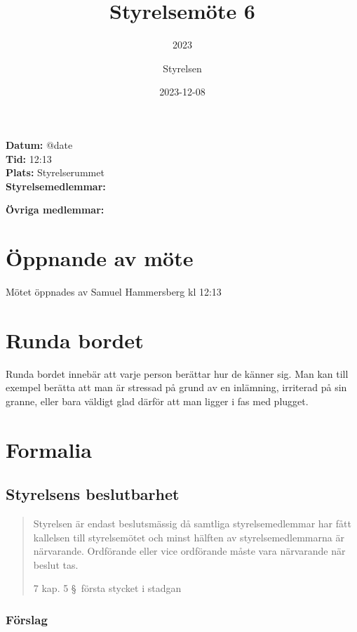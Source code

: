 \documentclass[protokoll]{dvd}
\begin{document}
\title{Styrelsemöte 6}
\subtitle{2023}
\author{Styrelsen}
\date{2023-12-08}


\textbf{Datum:} \csname @date\endcsname\\
\textbf{Tid:} 12:13\\
\textbf{Plats:} Styrelserummet\\
\textbf{Styrelsemedlemmar:}
\begin{närvarande_förtroendevalda}
\end{närvarande_förtroendevalda}

\textbf{Övriga medlemmar:} \\


\section{Öppnande av möte}

Mötet öppnades av Samuel Hammersberg kl 12:13

\section{Runda bordet}

Runda bordet innebär att varje person berättar hur de känner sig.
Man kan till exempel berätta att man är stressad på grund av en inlämning, irriterad på sin granne, eller bara väldigt glad därför att man ligger i fas med plugget.

\section{Formalia}

\subsection{Styrelsens beslutbarhet}

\blockquote[7 kap. 5 \S~första stycket i stadgan][]{%
    Styrelsen är endast beslutsmässig då samtliga styrelsemedlemmar har fått kallelsen till styrelsemötet och minst hälften av styrelsemedlemmarna är närvarande.
    Ordförande eller vice ordförande måste vara närvarande när beslut tas.
}

\subsubsection*{Förslag}
\end{document}
